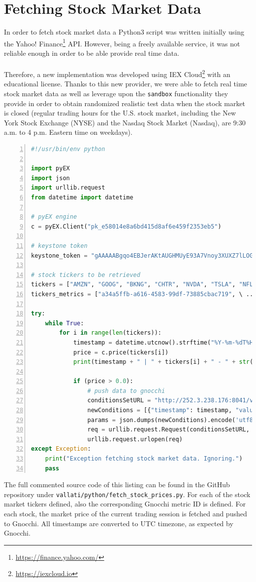 \documentclass[11pt,a4paper]{article}
\begin{document}
\section{Fetching Stock Market Data}
In order to fetch stock market data a Python3 script was written initially using the Yahoo! Finance\footnote{\url{https://finance.yahoo.com/}} API. However, being a freely available service, it was not reliable enough in order to be able provide real time data.\\
\\
Therefore, a new implementation was developed using IEX Cloud\footnote{\url{https://iexcloud.io}} with an educational license. Thanks to this new provider, we were able to fetch real time stock market data as well as leverage upon the \texttt{sandbox} functionality they provide in order to obtain randomized realistic test data when the stock market is closed (regular trading hours for the U.S. stock market, including the New York Stock Exchange (NYSE) and the Nasdaq Stock Market (Nasdaq), are 9:30 a.m. to 4 p.m. Eastern time on weekdays).
\begin{lstlisting}[language=python,caption={fetch\_stock\_prices.py},numbers=left]
#!/usr/bin/env python

import pyEX
import json
import urllib.request
from datetime import datetime

# pyEX engine
c = pyEX.Client("pk_e58014e8a6bd415d8af6e459f2353eb5")

# keystone token
keystone_token = "gAAAAABgqo4EBJerAKtAUGHMUyE93A7Vnoy3XUXZ7lLOGLXki_qXc..."

# stock tickers to be retrieved
tickers = ["AMZN", "GOOG", "BKNG", "CHTR", "NVDA", "TSLA", "NFLX", ...];
tickers_metrics = ["a34a5ffb-a616-4583-99df-73885cbac719", \ ...]

try:
    while True:
        for i in range(len(tickers)):
            timestamp = datetime.utcnow().strftime("%Y-%m-%dT%H:%M:%S")
            price = c.price(tickers[i])
            print(timestamp + " | " + tickers[i] + " - " + str(price))

            if (price > 0.0):
                # push data to gnocchi
                conditionsSetURL = "http://252.3.238.176:8041/v1/metric/" ...
                newConditions = [{"timestamp": timestamp, "value": ...
                params = json.dumps(newConditions).encode('utf8')
                req = urllib.request.Request(conditionsSetURL, data= ...
                urllib.request.urlopen(req)
except Exception:
    print("Exception fetching stock market data. Ignoring.")
    pass
\end{lstlisting}
The full commented source code of this listing can be found in the GitHub repository under \texttt{vallati/python/fetch\_stock\_prices.py}. For each of the stock market tickers defined, also the corresponding Gnocchi metric ID is defined. For each stock, the market price of the current trading session is fetched and pushed to Gnocchi. All timestamps are converted to UTC timezone, as expected by Gnocchi.
\end{document}
